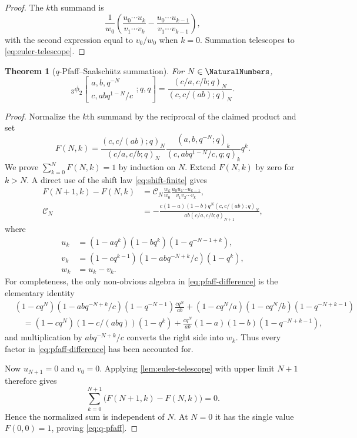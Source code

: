 \documentclass[11pt]{article}
\theoremstyle{blueplain}
\newtheorem{theorem}{Theorem}[section]
\theoremstyle{bluedef}
\begin{document}
\begin{proof}
The $k$th summand is
\[
\frac1{w_0}\left(
\frac{u_0\cdots u_k}{v_1\cdots v_k}
-\frac{u_0\cdots u_{k-1}}{v_1\cdots v_{k-1}}
\right),
\]
with the second expression equal to $v_0/w_0$ when $k=0$.  Summation telescopes to \eqref{eq:euler-telescope}.
\end{proof}

\begin{theorem}[$q$-Pfaff--Saalsch\"utz summation]\label{thm:q-pfaff}
For $N\in\NaturalNumbers$,
\begin{equation}\label{eq:q-pfaff}
{}_3\phi_2\!\left[
\begin{matrix}a,b,q^{-N}\\c,abq^{1-N}/c\end{matrix};q,q\right]
=\frac{(c/a,c/b;q)_N}{(c,c/(ab);q)_N}.
\end{equation}
\end{theorem}

\begin{proof}
Normalize the $k$th summand by the reciprocal of the claimed product and set
\begin{equation}\label{eq:F-pfaff}
F(N,k)=
\frac{(c,c/(ab);q)_N}{(c/a,c/b;q)_N}
\frac{(a,b,q^{-N};q)_k}{(c,abq^{1-N}/c,q;q)_k}q^k.
\end{equation}
We prove $\sum_{k=0}^{N}F(N,k)=1$ by induction on $N$.  Extend $F(N,k)$ by zero for $k>N$.  A direct use of the shift law \eqref{eq:shift-finite} gives
\begin{align}
F(N+1,k)-F(N,k)
&=\mathcal C_N
\frac{w_k}{w_0}
\frac{u_0u_1\cdots u_{k-1}}{v_1v_2\cdots v_k}, \label{eq:pfaff-difference}\\
\mathcal C_N
&=-\frac{c(1-a)(1-b)q^N(c,c/(ab);q)_N}
 {ab(c/a,c/b;q)_{N+1}}, \label{eq:pfaff-constant}
\end{align}
where
\begin{align*}
u_k&=(1-aq^k)(1-bq^k)(1-q^{-N-1+k}),\\
v_k&=(1-cq^{k-1})(1-abq^{-N+k}/c)(1-q^k),\\
w_k&=u_k-v_k.
\end{align*}
For completeness, the only non-obvious algebra in \eqref{eq:pfaff-difference} is the elementary identity
\begin{align*}
& (1-cq^N)(1-abq^{-N+k}/c)(1-q^{-N-1})\frac{cq^N}{ab}
 +(1-cq^N/a)(1-cq^N/b)(1-q^{-N+k-1})\\
&\quad=(1-cq^N)(1-c/(abq))(1-q^k)
 +\frac{cq^N}{ab}(1-a)(1-b)(1-q^{-N+k-1}),
\end{align*}
and multiplication by $abq^{-N+k}/c$ converts the right side into $w_k$.  Thus every factor in \eqref{eq:pfaff-difference} has been accounted for.

Now $u_{N+1}=0$ and $v_0=0$.  Applying \cref{lem:euler-telescope} with upper limit $N+1$ therefore gives
\[
\sum_{k=0}^{N+1}\bigl(F(N+1,k)-F(N,k)\bigr)=0.
\]
Hence the normalized sum is independent of $N$.  At $N=0$ it has the single value $F(0,0)=1$, proving \eqref{eq:q-pfaff}.
\end{proof}
\end{document}
